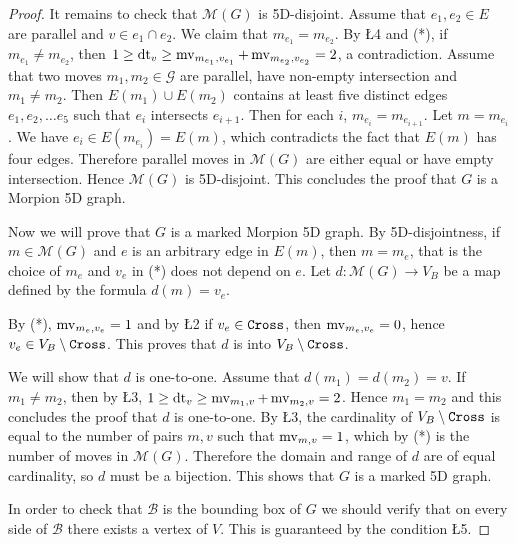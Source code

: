 \begin{proof}
It remains to check that ${\mathcal M}(G)$ is 5D-disjoint. 
  Assume that $e_1, e_2 \in E$ are parallel and $v \in e_1 \cap e_2$. We claim that $m_{e_1} = m_{e_2}$.
  By \L{4} and (*), if $m_{e_1} \neq m_{e_2}$, then $1 \geq \operatorname{dt}_v \geq \operatorname{mv}_{m_{e_1}, v_{e_1}} 
  	+ \operatorname{mv}_{m_{e_2}, v_{e_2}} = 2$, a contradiction. 
Assume that two moves $m_1, m_2 \in \mathcal{G}$ are parallel, have non-empty intersection and $m_1 \neq m_2$. Then 
  $E(m_1) \cup E(m_2)$ contains at least five distinct edges $e_1, e_2, \ldots e_5$ such that $e_{i}$ intersects $e_{i+1}$.
Then for each $i$, $m_{e_i} = m_{e_{i+1}}$. Let $m = m_{e_i}$. We have $e_i \in E(m_{e_i}) = E(m)$, which contradicts
  the fact that $E(m)$ has four edges. Therefore parallel moves in $\mathcal{M}(G)$ are either equal or have empty intersection.
Hence $\mathcal{M}(G)$ is 5D-disjoint. This concludes the proof that $G$ is a Morpion 5D graph.
  

Now we will prove that $G$ is a marked Morpion 5D graph.
  By 5D-disjointness, if $m \in \mathcal{M}(G)$ and $e$ is an arbitrary edge in $E(m)$, then $m = m_e$, that is the choice of $m_e$ and $v_e$ in (*) does not depend on $e$. 
Let $d \colon \mathcal{M}(G) \to V_B$ be a map defined by the formula $d(m) = v_e$. 

By (*), $\operatorname{mv}_{m_e, v_e} = 1$ and by \L{2} if $v_e \in \texttt{Cross}$, then $\operatorname{mv}_{m_e, v_e} = 0$, hence $v_e  \in V_B \setminus \texttt{Cross}$. This proves that $d$ is into $V_B \setminus \texttt{Cross}$.

We will show that $d$ is one-to-one. Assume that $d(m_1) = d(m_2) = v$. If $m_1 \neq m_2$, then by \L{3}, $1 \geq \operatorname{dt}_v \geq \operatorname{mv}_{m_1, v} + \operatorname{mv}_{m_2, v} = 2$. Hence $m_1 = m_2$ and this 
concludes the proof that $d$ is one-to-one. %
By \L{3}, the cardinality of $V_B \setminus \texttt{Cross}$ is equal to the number of pairs $m, v$ such that $\operatorname{mv}_{m,v} = 1$, which by (*) is the number of moves in $\mathcal{M}(G)$.
  Therefore the domain and range of $d$ are of equal cardinality, so $d$ must be a bijection. This shows that $G$ is a marked 5D graph. 
  
In order to check that $\mathcal{B}$ is the bounding box of $G$ we should verify that on every side of $\mathcal{B}$ there exists
a vertex of $V$. This is guaranteed by the condition \L{5}. %
  

\end{proof}
